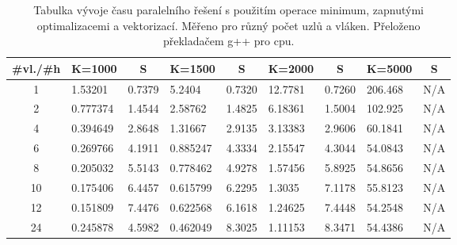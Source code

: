 \documentclass[a4paper,11pt]{article}
\begin{document}
  \begin{table}[ht]
  \begin{center}
   \begin{tabular}{|c|l|c|l|c|l|c|l|c|}
    \hline 
    \#vl./\#h & K=1000 & S & K=1500 & S & K=2000 & S & K=5000 & S\\
   \hline 
   \hline 
   1 & 1.53201 & 0.7379  & 5.2404 & 0.7320 & 12.7781 & 0.7260 & 206.468 & N/A\\
   \hline
    2 & 0.777374 & 1.4544 & 2.58762 & 1.4825 & 6.18361 & 1.5004 & 102.925 & N/A\\
   \hline
    4 & 0.394649 & 2.8648 & 1.31667 & 2.9135 & 3.13383 & 2.9606 & 60.1841 & N/A\\
   \hline
    6 & 0.269766 & 4.1911 & 0.885247 & 4.3334 & 2.15547 & 4.3044 & 54.0843 & N/A\\
   \hline
    8 & 0.205032 & 5.5143 & 0.778462 & 4.9278 & 1.57456 & 5.8925 & 54.8656 & N/A\\
      \hline
    10 & 0.175406 & 6.4457 & 0.615799 & 6.2295 & 1.3035 & 7.1178 & 55.8123 & N/A\\ 
      \hline
    12 & 0.151809 & 7.4476 & 0.622568 & 6.1618 & 1.24625 & 7.4448 & 54.2548 & N/A\\
      \hline
    24 & 0.245878 & 4.5982 & 0.462049 & 8.3025 & 1.11153 & 8.3471 & 54.4386 & N/A\\
   \hline    
    \end{tabular}
   \caption{Tabulka vývoje času paralelního řešení s použitím operace minimum, zapnutými optimalizacemi a vektorizací. Měřeno pro různý počet uzlů a vláken. Přeloženo 
   překladačem g++ pro cpu.}
   \label{tab.tab18}
  \end{center}   
  \end{table}

  \clearpage
  
\end{document}
